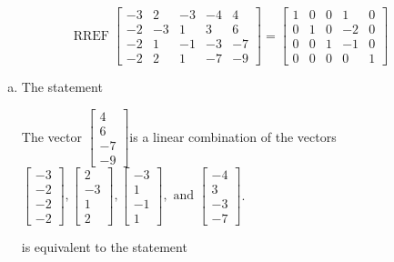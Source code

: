 \begin{exerciseAnswer} 
\[\operatorname{RREF}  \left[\begin{array}{cccc|c}
-3 & 2 & -3 & -4 & 4 \\
-2 & -3 & 1 & 3 & 6 \\
-2 & 1 & -1 & -3 & -7 \\
-2 & 2 & 1 & -7 & -9
\end{array}\right] = \left[\begin{array}{cccc|c}
1 & 0 & 0 & 1 & 0 \\
0 & 1 & 0 & -2 & 0 \\
0 & 0 & 1 & -1 & 0 \\
0 & 0 & 0 & 0 & 1
\end{array}\right] \]
\begin{enumerate}[(a)]
\item  The statement 
\begin{center}\begin{minipage}{0.8\textwidth}
 The vector \( \left[\begin{array}{c}
4 \\
6 \\
-7 \\
-9
\end{array}\right] \)is a linear combination of the vectors \( \left[\begin{array}{c}
-3 \\
-2 \\
-2 \\
-2
\end{array}\right] , \left[\begin{array}{c}
2 \\
-3 \\
1 \\
2
\end{array}\right] , \left[\begin{array}{c}
-3 \\
1 \\
-1 \\
1
\end{array}\right] , \text{ and } \left[\begin{array}{c}
-4 \\
3 \\
-3 \\
-7
\end{array}\right] \). 
\end{minipage}\end{center}
     is equivalent to the statement 
\begin{center}\begin{minipage}{0.8\textwidth}

\end{minipage}
\end{center}
\end{enumerate}
\end{exerciseAnswer}
